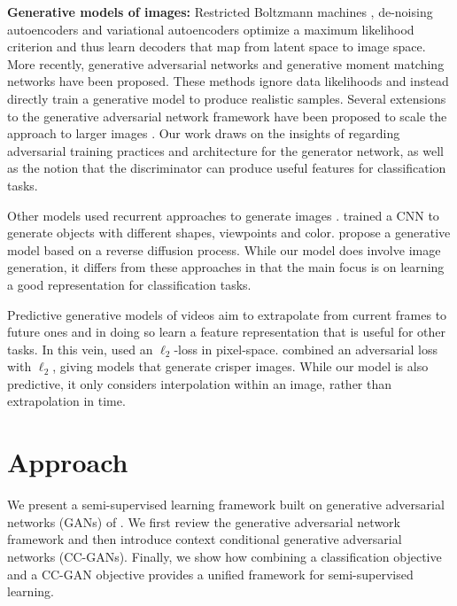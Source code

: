 \documentclass{article} \usepackage{iclr2017_conference,times}
\begin{document}
\textbf{Generative models of images:} Restricted Boltzmann machines \citep{salakhutdinov2015},
de-noising autoencoders \citep{vincent2008} and variational
autoencoders \citep{kingma2014a} optimize a maximum likelihood
criterion and thus learn decoders that map from latent space to image
space.  More recently, generative adversarial networks
\citep{goodfellow2014} and generative moment matching networks
\citep{li2015,karolina2015} have been proposed.  These methods ignore data likelihoods
and instead directly train a generative model to produce realistic
samples.  Several extensions to the generative adversarial network
framework have been proposed to scale the approach to larger images
\citep{denton2015,radford2016,Salimans2016}. Our
work draws on the insights of \cite{radford2016} regarding adversarial training practices
and architecture for the generator network, as well as the notion that
the discriminator can produce useful features for classification
tasks.

Other models used recurrent approaches to generate images
\citep{gregor2015, theis2015, mansimov2016, oord2016}.  \cite{dosovitskiy2015} trained a CNN to generate objects with
different shapes, viewpoints and color.  
\cite{sohldickstein2015} propose a generative model based on a reverse
diffusion process. While our model does involve image generation, it
differs from these approaches in that the main focus is on learning a
good representation for classification tasks.

Predictive generative models of videos aim to extrapolate from current
frames to future ones and in doing so learn a feature
representation that is useful for other tasks. In this vein, \cite{Ranzato14} used an
$\ell_2$-loss in pixel-space. \cite{Mathieu15} combined
an adversarial loss with $\ell_2$, giving models that generate crisper
images. While our model is also predictive, it only
considers interpolation within an image, rather than extrapolation in
time. 
 

\section{Approach}
We present a semi-supervised learning framework built on generative adversarial networks (GANs) of \cite{goodfellow2014}. 
We first review the generative adversarial network framework and then introduce context conditional generative adversarial networks (CC-GANs).
Finally, we show how combining a classification objective and a CC-GAN objective provides a unified framework for semi-supervised learning.
\end{document}
